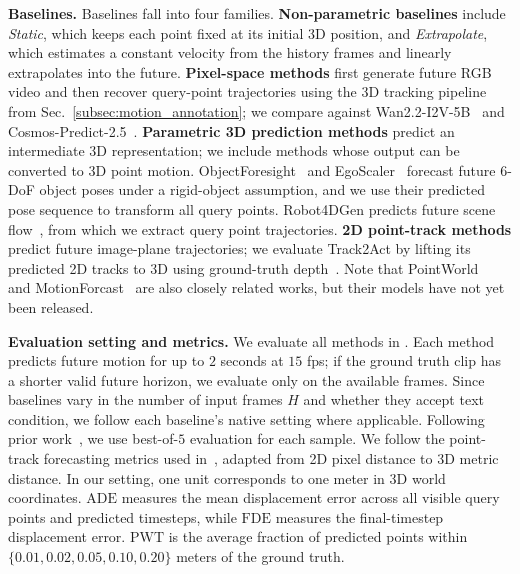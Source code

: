 \noindent \textbf{Baselines.} 
Baselines fall into four families. \textbf{Non-parametric baselines} include \textit{Static}, which keeps each point fixed at its initial 3D position, and \textit{Extrapolate}, which estimates a constant velocity from the history frames and linearly extrapolates into the future. \textbf{Pixel-space methods} first generate future RGB video and then recover query-point trajectories using the 3D tracking pipeline from Sec.~\ref{subsec:motion_annotation}; we compare against Wan2.2-I2V-5B~\cite{wan22} and Cosmos-Predict-2.5~\cite{nvidia2025cosmos}. \textbf{Parametric 3D prediction methods} predict an intermediate 3D representation; we include methods whose output can be converted to 3D point motion. ObjectForesight~\cite{soraki2026objectforesightpredictingfuture3d} and EgoScaler~\cite{Yoshida_2025_CVPR} forecast future 6-DoF object poses under a rigid-object assumption, and we use their predicted pose sequence to transform all query points. Robot4DGen predicts future scene flow~\cite{liu2025geometryaware4dvideo}, from which we extract query point trajectories. \textbf{2D point-track methods} predict future image-plane trajectories; we evaluate Track2Act by lifting its predicted 2D tracks to 3D using ground-truth depth~\cite{track2act}. Note that PointWorld~\cite{pointworld} and MotionForcast~\cite{thakkar2026forecastingmotion} are also closely related works, but their models have not yet been released.



\noindent \textbf{Evaluation setting and metrics.}
We evaluate all methods in \benchmarkname{}. Each method predicts future motion for up to $2$ seconds at $15$ fps; if the ground truth clip has a shorter valid future horizon, we evaluate only on the available frames. Since baselines vary in the number of input frames $H$ and whether they accept text condition, we follow each baseline's native setting where applicable. 
Following prior work~\cite{thakkar2026forecastingmotion}, we use best-of-$5$ evaluation for each sample.
We follow the point-track forecasting metrics used in~\cite{thakkar2026forecastingmotion}, adapted from 2D pixel distance to 3D metric distance. In our setting, one unit corresponds to one meter in 3D world coordinates. $\mathrm{ADE}$ measures the mean displacement error across all visible query points and predicted timesteps, while $\mathrm{FDE}$ measures the final-timestep displacement error. $\mathrm{PWT}$ is the average fraction of predicted points within $\{0.01,0.02,0.05,0.10,0.20\}$ meters of the ground truth. 



